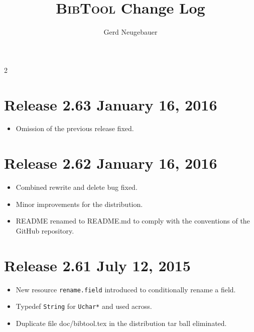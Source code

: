 \documentclass[11pt,a4paper]{scrartcl}
\newenvironment{Developers}{}{}
\newcommand\Developer[3]{}
\newcommand\rsc[1]{\texttt{#1}}
\newcommand\File[1]{\textsf{#1}}
\newcommand\BibTool{\textsc{BibTool}}
\newenvironment{Release}[2]{%
  \def\tmp{#2}%
  \section*{Release #1 \ifx\tmp\empty\else{\normalsize[#2]}\fi}
  \begin{itemize}
}{\end{itemize}}
\newenvironment{Fix}[1]{\item }{}
\newenvironment{New}[1]{\item }{}
\newenvironment{Update}[1]{\item }{}
\begin{document}

\title{\BibTool{} Change Log}
\author{Gerd Neugebauer}
\date{}
\maketitle

\begin{Developers}
  \Developer{gene}{Gerd Neugebauer}{gene@gerd-neugebauer.de}
\end{Developers}

\begin{multicols}2\RaggedRight

 \begin{Release}{2.63}{January 16, 2016}
  \begin{Fix}{gene}
    Omission of the previous release fixed.
  \end{Fix}
 \end{Release}

 \begin{Release}{2.62}{January 16, 2016}
  \begin{Fix}{gene}
    Combined rewrite and delete bug fixed.
  \end{Fix}
  \begin{Update}{gene}
    Minor improvements for the distribution.
  \end{Update}
  \begin{Update}{gene}
    \File{README} renamed to \File{README.md} to comply with the
    conventions of the GitHub repository.
  \end{Update}
 \end{Release}

 \begin{Release}{2.61}{July 12, 2015}
  \begin{New}{gene}
    New resource \rsc{rename.field} introduced to conditionally rename a
    field.
  \end{New}
  \begin{Update}{gene}
    Typedef \verb|String| for \verb|Uchar*| and used across.
  \end{Update}
  \begin{Fix}{gene}
    Duplicate file \File{doc/bibtool.tex} in the distribution tar ball
    eliminated.
  \end{Fix}
 \end{Release}


\end{multicols}
\end{document}

